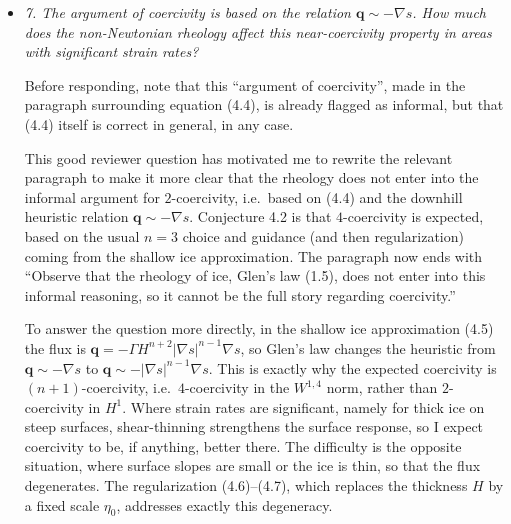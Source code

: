 \documentclass[11pt,reqno]{amsart}
\newcommand{\bq}{\mathbf{q}}
\newcommand{\grad}{\nabla}
\newcommand{\reply}[2]{%
\medskip
\item \emph{#1}

\medskip
\noindent #2
}
\begin{document}
\begin{itemize}[itemindent=0mm, labelsep=5mm]
\reply{7. The argument of coercivity is based on the relation $\bq \sim -\grad s$. How much does the non-Newtonian rheology affect this near-coercivity property in areas with significant strain rates?}
{Before responding, note that this ``argument of coercivity'', made in the paragraph surrounding equation (4.4), is already flagged as informal, but that (4.4) itself is correct in general, in any case. \par
This good reviewer question has motivated me to rewrite the relevant paragraph to make it more clear that the rheology does not enter into the informal argument for $2$-coercivity, i.e.~based on (4.4) and the downhill heuristic relation $\bq \sim -\grad s$.  Conjecture 4.2 is that $4$-coercivity is expected, based on the usual $n=3$ choice and guidance (and then regularization) coming from the shallow ice approximation.  The paragraph now ends with ``Observe that the rheology of ice, Glen's law (1.5), does not enter into this informal reasoning, so it cannot be the full story regarding coercivity.'' \par
To answer the question more directly, in the shallow ice approximation (4.5) the flux is $\bq = -\Gamma H^{n+2}|\grad s|^{n-1}\grad s$, so Glen's law changes the heuristic from $\bq\sim -\grad s$ to $\bq\sim -|\grad s|^{n-1}\grad s$.  This is exactly why the expected coercivity is $(n+1)$-coercivity, i.e.~$4$-coercivity in the $W^{1,4}$ norm, rather than $2$-coercivity in $H^1$.  Where strain rates are significant, namely for thick ice on steep surfaces, shear-thinning strengthens the surface response, so I expect coercivity to be, if anything, better there.  The difficulty is the opposite situation, where surface slopes are small or the ice is thin, so that the flux degenerates.  The regularization (4.6)--(4.7), which replaces the thickness $H$ by a fixed scale $\eta_0$, addresses exactly this degeneracy.}


\end{itemize}
\end{document}
